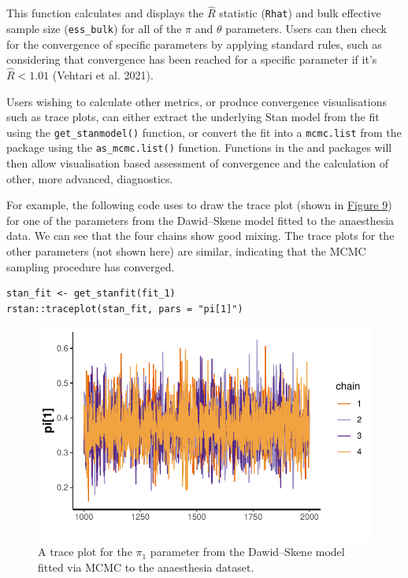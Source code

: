 This function calculates and displays the \(\hat{R}\) statistic (\texttt{Rhat}) and bulk
effective sample size (\texttt{ess\_bulk}) for all of the \(\pi\) and \(\theta\)
parameters. Users can then check for the convergence of specific parameters by
applying standard rules, such as considering that convergence has been reached
for a specific parameter if it's \(\hat{R} < 1.01\) (Vehtari et al. 2021).

Users wishing to calculate other metrics, or produce convergence visualisations
such as trace plots, can either extract the underlying Stan model from the
 fit using the \texttt{get\_stanmodel()} function, or convert the
fit into a \texttt{mcmc.list} from the  package using the
\texttt{as\_mcmc.list()} function. Functions in the  and
 packages will then allow visualisation based assessment of
convergence and the calculation of other, more advanced, diagnostics.

For example, the following code uses  to draw the trace plot
(shown in \protect\hyperlink{fig:plot-rstan-traceplot}{Figure 9}) for one of the parameters from
the Dawid--Skene model fitted to the anaesthesia data. We can see that the
four chains show good mixing. The trace plots for the other parameters
(not shown here) are similar, indicating that the MCMC sampling procedure has
converged.

\begin{verbatim}
stan_fit <- get_stanfit(fit_1)
rstan::traceplot(stan_fit, pars = "pi[1]")
\end{verbatim}

\begin{figure}

{\centering \includegraphics{RJ-2023-064_files/figure-latex/plot-rstan-traceplot-1} 

}

\caption{A trace plot for the $\pi_1$ parameter from the Dawid--Skene model fitted via MCMC to the anaesthesia dataset.}\label{fig:plot-rstan-traceplot}
\end{figure}

